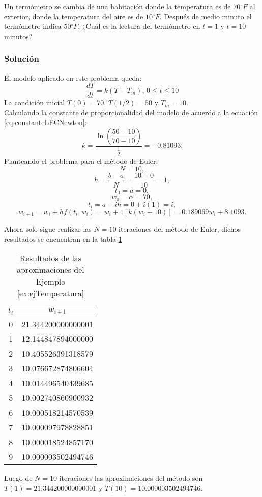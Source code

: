 \begin{exerciseT}{\rm Un termómetro se cambia de una habitación donde la temperatura es de $70\ensuremath{^\circ}F$ al exterior, donde 
la temperatura del aire es de $10\ensuremath{^\circ}F$. Después de medio minuto el termómetro indica $50\ensuremath{^\circ}F$. ¿Cuál es 
la lectura del termómetro en $t=1$ y $t=10$ minutos?

	\subsubsection*{Solución}
	El modelo aplicado en este problema queda:
	$$\dfrac{dT}{dt} = k(T-T_m), \, 0\leq t\leq 10$$
	La condición inicial $T(0)=70$, $T(1/2)=50$ y $T_m=10$.\\
	Calculando la constante de proporcionalidad del modelo de acuerdo a la ecuación \ref{eq:constanteLECNewton}:	
	$$k=\frac{\ln \left(\dfrac{50-10}{70-10} \right)}{\frac{1}{2}} = -0.81093.$$
	Planteando el problema para el método de Euler:
	$$N=10,$$
	$$h=\frac{b-a}{N} = \frac{10-0}{10} = 1,$$
	$$t_0 = a = 0,$$
	$$w_0 = \alpha = 70,$$
	$$t_i = a+ih = 0 + i(1) = i,$$
	$$w_{i+1} = w_i + hf(t_i,w_i) = w_i + 1[k(w_i-10)] = 0.189069w_i + 8.1093.$$
	
	Ahora solo sigue realizar las $N=10$ iteraciones del método de Euler, dichos resultados se encuentran en la tabla \ref{table:resEjTemperatura}
	
	\begin{table}[H]
	    \centering
      	\begin{tabular}{c|c}
      		\toprule
      		$t_i$ & $w_{i+1}$\\
      		\midrule
      		0 & 21.344200000000001\\
			1 & 12.144847894000000\\
			2 & 10.405526391318579\\
			3 & 10.076672874806604\\
			4 & 10.014496540439685\\
			5 & 10.002740860900932\\
			6 & 10.000518214570539\\
			7 & 10.000097978828851\\
			8 & 10.000018524857170\\
			9 & 10.000003502494746\\
			\bottomrule
      	\end{tabular}
      	\caption{Resultados de las aproximaciones del Ejemplo \ref{ex:ejTemperatura}}
      	\label{table:resEjTemperatura}
  	\end{table} 
	
	Luego de $N=10$ iteraciones las aproximaciones del método son $T(1) = 21.344200000000001$ y $T(10) = 10.000003502494746$.
	\label{ex:ejTemperatura}
}\end{exerciseT}

